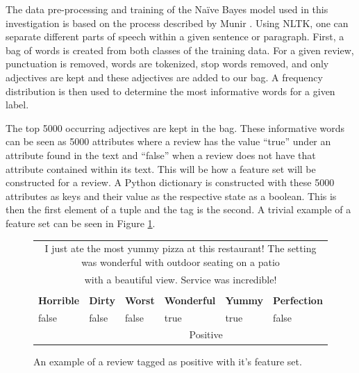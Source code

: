 The data pre-processing and training of the Na\"ive Bayes model used in this investigation is based on the process described by Munir \cite{SamiraMunir}. Using NLTK, one can separate different parts of speech within a given sentence or paragraph. First, a bag of words is created from both classes of
the training data. For a given review, punctuation is removed, words are tokenized, stop words removed, and only adjectives are kept and these adjectives are added to our bag. A frequency distribution is then used to determine the most informative words for a given label.

The top 5000 occurring adjectives are kept in the bag. These informative words can be seen as 5000 attributes where a review has the value ``true'' under an attribute found in the text and ``false'' when a review does not have that attribute contained within its text. This will be how a feature set will be constructed for a review. A Python dictionary is constructed with these 5000 attributes as keys and their value as the respective state as a boolean. This is then the first element of a tuple and the tag is the second. A trivial example of a feature set can be seen in Figure \ref{fig:bog-attri}.

\begin{figure}[h]
    \centering
    \begin{tabular}{ |p{2cm}|p{2cm}|p{2cm}|p{2cm}|p{2cm}|p{2cm}|}
        \hline
        \rowcolor{Gray}
        \multicolumn{6}{|c|}{Review Text}                                                                                                       \\
        \hline
        \multicolumn{6}{|c|}{I just ate the most yummy pizza at this restaurant! The setting was wonderful with outdoor seating on a patio}     \\
        \multicolumn{6}{|c|}{ with a beautiful view. Service was incredible!}                                     \\
        \hline
        \rowcolor{Gray}
        \multicolumn{6}{|c|}{Feature Set}                                                                                                       \\
        \hline
        \textbf{Horrible}         & \textbf{Dirty}                 & \textbf{Worst} & \textbf{Wonderful} & \textbf{Yummy} & \textbf{Perfection} \\
        \hline
        false                     & false                          & false          & true               & true           & false               \\
        \hline
        \rowcolor{LightGray}
        \multicolumn{1}{|c|}{Tag} & \multicolumn{5}{|c|}{Positive}                                                                              \\
        \hline
    \end{tabular}
    \vspace*{5mm}
    \caption{An example of a review tagged as positive with it's feature set.}
    \label{fig:bog-attri}
\end{figure}

